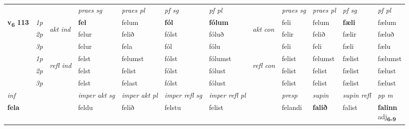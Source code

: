 \begin{longtable}[l]{X>{\footnotesize\itshape}llXXXXlXXXX}
 & &   & \textit{praes sg}  & \textit{praes pl}    & \textit{ pf sg} & \textit{pf pl} & & \textit{praes sg}  & \textit{praes pl}    & \textit{pf sg} & \textit{pf pl }  \\ \cmidrule{4-7} \cmidrule{9-12}
 \multirow{2}{*}{{{\textbf{v{\textsubscript{6}}} \Large{\textbf{113}}}}}  & 1p & \multirow{3}{*}{\begin{turn}{90}\textit{akt ind}\end{turn}} & \textbf{fel} & felum & \textbf{fól} & \textbf{fólum} & \multirow{3}{*}{\begin{turn}{90}\textit{akt con}\end{turn}} &feli & felum & \textbf{fæli} & fælum\\*
 & 2p &  &  felur  & felið & fólst & fóluð & & felir & felið & fælir & fæluð \\*
 & 3p &  & felur & fela & fól & fólu & & feli & feli& fæli & fælu \\*
\cmidrule{4-7} \cmidrule{9-12}
 & 1p & \multirow{3}{*}{\begin{turn}{90}\textit{refl ind}\end{turn}}  & felst & felumst & fólst & fólumst & \multirow{3}{*}{\begin{turn}{90}\textit{refl con}\end{turn}}  &felist & felumst & fælist & fælumst \\*
 & 2p &  & felst & felist & fólst & fólust & &felist & felist & fælist & fælust \\*
 & 3p  & & felst & felast & fólst & fólust & & felist & felist& fælist & fælust \\*
\cmidrule{4-7} \cmidrule{9-12}

   {\textit{inf}} & &  & \textit{imper akt sg} & \textit{imper akt pl} & \textit{imper refl sg} & \textit{imper refl pl} && \textit{presp} & \textit{supin} & \textit{supin refl} & \textit{pp m} \\*
  {\textbf{fela}} & && feldu  & felið & felstu & felist && felandi &  \textbf{falið} & falist & \specialcell{\textbf{falinn} \\ adj\textbf{\textsubscript{6-9}}} \\*

\midrule


\end{longtable}
